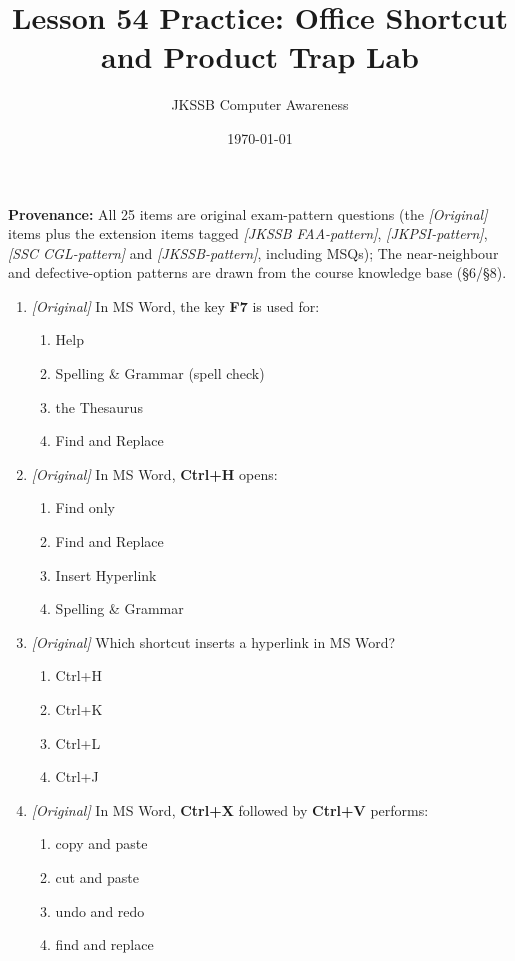 \documentclass[11pt]{article}
\title{Lesson 54 Practice: Office Shortcut and Product Trap Lab}
\author{JKSSB Computer Awareness}
\date{\today}
\begin{document}
\maketitle
\noindent\textbf{Provenance:} All 25 items are original exam-pattern questions (the \textit{[Original]} items plus the extension items tagged \textit{[JKSSB FAA-pattern]}, \textit{[JKPSI-pattern]}, \textit{[SSC CGL-pattern]} and \textit{[JKSSB-pattern]}, including MSQs); The near-neighbour and defective-option patterns are drawn from the course knowledge base (\S6/\S8).


\begin{enumerate}[label=\textbf{Q\arabic*.}, leftmargin=*]
\item \textit{[Original]} In MS Word, the key \textbf{F7} is used for:
  \begin{enumerate}[label=\Alph*.]
    \item Help
    \item Spelling \& Grammar (spell check)
    \item the Thesaurus
    \item Find and Replace
  \end{enumerate}
\item \textit{[Original]} In MS Word, \textbf{Ctrl+H} opens:
  \begin{enumerate}[label=\Alph*.]
    \item Find only
    \item Find and Replace
    \item Insert Hyperlink
    \item Spelling \& Grammar
  \end{enumerate}
\item \textit{[Original]} Which shortcut inserts a hyperlink in MS Word?
  \begin{enumerate}[label=\Alph*.]
    \item Ctrl+H
    \item Ctrl+K
    \item Ctrl+L
    \item Ctrl+J
  \end{enumerate}
\item \textit{[Original]} In MS Word, \textbf{Ctrl+X} followed by
  \textbf{Ctrl+V} performs:
  \begin{enumerate}[label=\Alph*.]
    \item copy and paste
    \item cut and paste
    \item undo and redo
    \item find and replace

\end{enumerate}
\end{enumerate}
\end{document}
